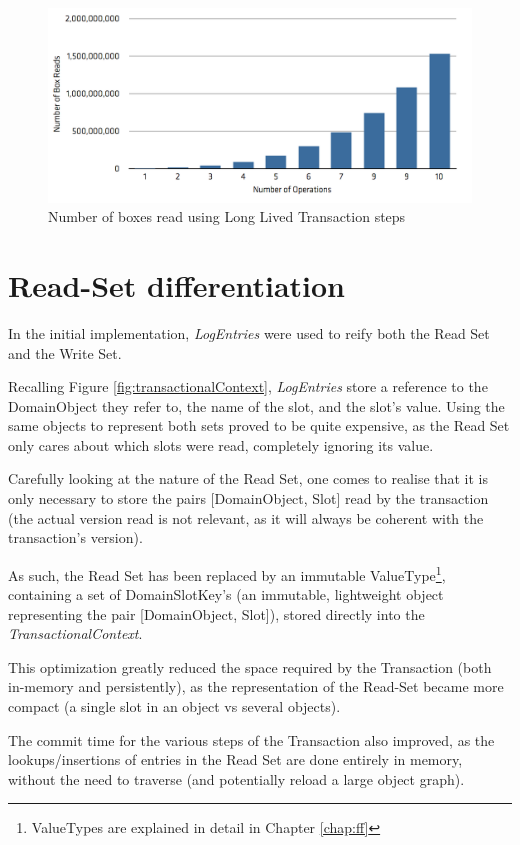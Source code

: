\begin{figure}
\centering
\includegraphics[width=0.9\linewidth]{box-long-v1}
\caption{Number of boxes read using Long Lived Transaction steps}
\label{fig:long-box-v1}
\end{figure}

\section{Read-Set differentiation}

In the initial implementation, {\it LogEntries} were used to reify
both the Read Set and the Write Set.

Recalling Figure \ref{fig:transactionalContext}, {\it LogEntries} store a
reference to the DomainObject they refer to, the name of the slot, and
the slot's value. Using the same objects to represent both sets proved
to be quite expensive, as the Read Set only cares about which slots
were read, completely ignoring its value.

Carefully looking at the nature of the Read Set, one comes to realise
that it is only necessary to store the pairs [DomainObject, Slot] read
by the transaction (the actual version read is not relevant, as it
will always be coherent with the transaction's version).

As such, the Read Set has been replaced by an immutable
ValueType\footnote{ValueTypes are explained in detail in Chapter
  \ref{chap:ff}}, containing a set of DomainSlotKey's (an immutable,
lightweight object representing the pair [DomainObject, Slot]), stored
directly into the {\it TransactionalContext}.

This optimization greatly reduced the space required by the
Transaction (both in-memory and persistently), as the representation
of the Read-Set became more compact (a single slot in an object vs
several objects).

The commit time for the various steps of the Transaction also
improved, as the lookups/insertions of entries in the Read Set are
done entirely in memory, without the need to traverse (and
potentially reload a large object graph).

